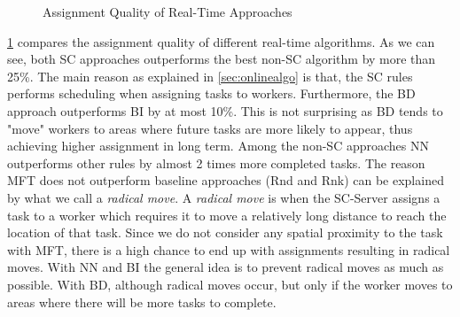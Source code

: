 \begin{figure}[h]
    \centering
    \caption{Assignment Quality of Real-Time Approaches}
    \label{fig:quality}
\end{figure}

\cref{fig:quality} compares the assignment quality of different real-time algorithms. As we can see, both SC approaches outperforms the best non-SC algorithm by more than 25\%. The main reason as explained in \cref{sec:onlinealgo} is that, the SC rules performs scheduling when assigning tasks to workers. Furthermore, the BD approach outperforms BI by at most 10\%. This is not surprising as BD tends to "move" workers to areas where future tasks are more likely to appear, thus achieving higher assignment in long term. Among the non-SC approaches NN outperforms other rules by almost 2 times more completed tasks. The reason MFT does not outperform baseline approaches (Rnd and Rnk) can be explained by what we call a \emph{radical move}. A \emph{radical move} is when the SC-Server assigns a task to a worker which requires it to move a relatively long distance to reach the location of that task. Since we do not consider any spatial proximity to the task with MFT, there is a high chance to end up with assignments resulting in radical moves. With NN and BI the general idea is to prevent radical moves as much as possible. With BD, although radical moves occur, but only if the worker moves to areas where there will be more tasks to complete. 

